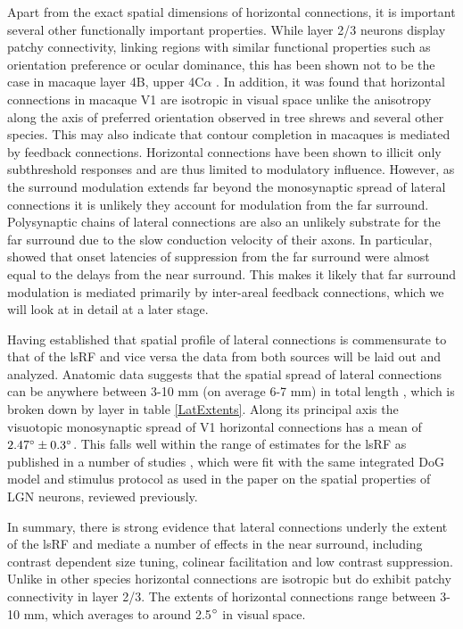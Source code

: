 Apart from the exact spatial dimensions of horizontal connections, it
is important several other functionally important properties. While
layer 2/3 neurons display patchy connectivity, linking regions with
similar functional properties such as orientation preference or ocular
dominance, this has been shown not to be the case in macaque layer 4B,
upper 4C$\alpha$ \citep{Angelucci2002}. In addition, it was found that
horizontal connections in macaque V1 are isotropic in visual space
unlike the anisotropy along the axis of preferred orientation observed
in tree shrews \citep{Bosking1997} and several other species. This may
also indicate that contour completion in macaques is mediated by
feedback connections. Horizontal connections have been shown to
illicit only subthreshold responses \citep{Hirsch1991} and are thus
limited to modulatory influence. However, as the surround modulation
extends far beyond the monosynaptic spread of lateral connections it
is unlikely they account for modulation from the far
surround. Polysynaptic chains of lateral connections are also an
unlikely substrate for the far surround due to the slow conduction
velocity of their axons. In particular, \cite{Bair2003} showed that
onset latencies of suppression from the far surround were almost equal
to the delays from the near surround. This makes it likely that far
surround modulation is mediated primarily by inter-areal feedback
connections, which we will look at in detail at a later stage.

Having established that spatial profile of lateral connections is
commensurate to that of the lsRF and vice versa the data from both
sources will be laid out and analyzed. Anatomic data suggests that the
spatial spread of lateral connections can be anywhere between 3-10 mm
(on average 6-7 mm) in total length \citep{Angelucci2002}, which is
broken down by layer in table \ref{LatExtents}. Along its principal
axis the visuotopic monosynaptic spread of V1 horizontal connections
has a mean of $2.47\degree \pm 0.3\degree$. This falls well within the
range of estimates for the lsRF as published in a number of studies
\citep{Shushruth2009,Sceniak1999,Sceniak2001}, which were fit with the
same integrated DoG model and stimulus protocol as used in the
\cite{Sceniak2006} paper on the spatial properties of LGN neurons,
reviewed previously.

In summary, there is strong evidence that lateral connections underly
the extent of the lsRF and mediate a number of effects in the near
surround, including contrast dependent size tuning, colinear
facilitation and low contrast suppression. Unlike in other species
horizontal connections are isotropic but do exhibit patchy
connectivity in layer 2/3. The extents of horizontal connections range
between 3-10 mm, which averages to around 2.5$\degree$ in visual
space.


